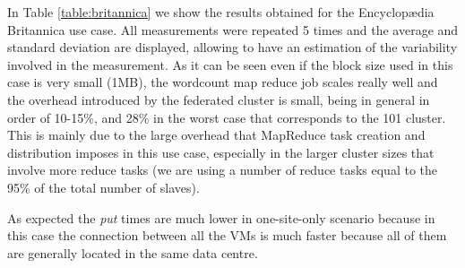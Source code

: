 In Table \ref{table:britannica} we show the results obtained for the Encyclop{\ae}dia Britannica use case. All measurements were repeated 5 times and the average and standard deviation are displayed, allowing to have an estimation of the variability involved in the measurement. As it can be seen even if the block size used in this case is very small (1MB), the wordcount map reduce job scales really well and the overhead introduced by the federated cluster is small, being in general in order of 10-15\%, and 28\% in the worst case that corresponds to the 101 cluster. This is mainly due to the large overhead that MapReduce task creation and distribution imposes in this use case, especially in the larger cluster sizes that involve more reduce tasks (we are using a number of reduce tasks equal to the 95\% of the total number of slaves).

As expected the \emph{put} times are much lower in one-site-only scenario because in this case the connection between all the VMs is much faster because all of them are generally located in the same data centre.

